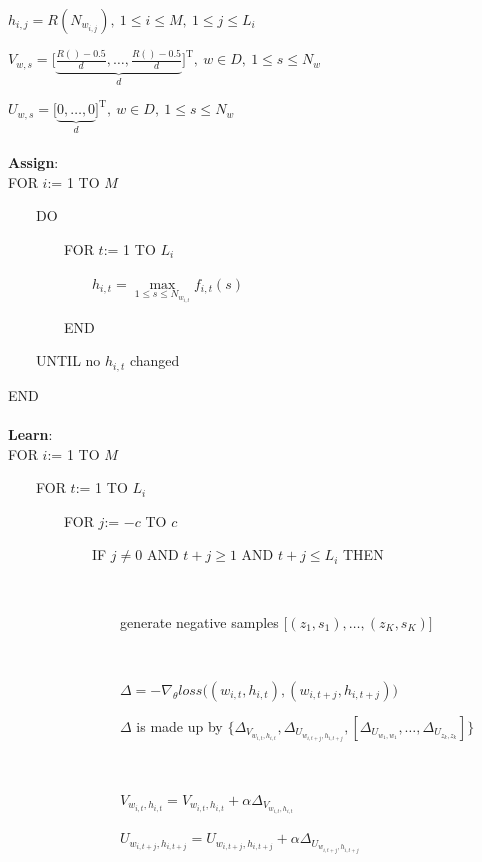 \documentclass[12pt,a4paper,twoside]{book}
\begin{document}
$h_{i,j} = R(N_{w_{i,j}}),  \ 1\leq i \leq M,  \ 1\leq j\leq L_i$

$V_{w,s} = \Big[\underbrace{\frac{R()-0.5}{d},\ldots,\frac{R()-0.5}{d}}_{d}\Big]^{\mathrm{T}}, \ w\in D, \  1\leq s\leq N_w$

$U_{w,s} = \Big[\underbrace{0,\ldots,0}_{d}\Big]^{\mathrm{T}},  \ w\in D, \  1\leq s\leq N_w$
\paragraph{} \textbf{Assign}:\\

FOR $i$:= 1 TO $M$

\ \ \ \ DO

\ \ \ \ \ \ \ \ FOR $t$:= 1 TO $L_i$

\ \ \ \ \ \ \ \ \ \ \ \ $h_{i,t} = \max\limits_{1\leq s\leq N_{w_{i,t}}} f_{i,t}(s)$

\ \ \ \ \ \ \ \ END

\ \ \ \ UNTIL no $h_{i,t}$ changed

END
\paragraph{} \textbf{Learn}:\\

FOR $i$:= 1 TO $M$

\ \ \ \ FOR $t$:= 1 TO $L_i$

\ \ \ \ \ \ \ \ FOR $j$:= $-c$ TO $c$

\ \ \ \ \ \ \ \ \ \ \ \ IF $j\neq 0$ AND $t+j\geq1$ AND $t+j\leq L_i$ THEN

\ \ \ \ \ \ \ \ \ \ \ \ \ \ \ \

\ \ \ \ \ \ \ \ \ \ \ \ \ \ \ \ generate negative samples $\big [(z_1,s_1),\ldots,(z_K,s_K)\big ]$

\ \ \ \ \ \ \ \ \ \ \ \ \ \ \ \

\ \ \ \ \ \ \ \ \ \ \ \ \ \ \ \ $\Delta = -\nabla_\theta loss\big ( (w_{i,t},h_{i,t}),(w_{i,t+j},h_{i,t+j})\big )$

\ \ \ \ \ \ \ \ \ \ \ \ \ \ \ \ $\Delta$ is made up by $ \{\Delta_{V_{w_{i,t},h_{i,t}}}, \Delta_{U_{w_{i,t+j},h_{i,t+j}}}, [\Delta_{U_{w_1,w_1}},\ldots,\Delta_{U_{z_k,z_k}}]\}$

\ \ \ \ \ \ \ \ \ \ \ \ \ \ \ \

\ \ \ \ \ \ \ \ \ \ \ \ \ \ \ \ $V_{w_{i,t},h_{i,t}} = V_{w_{i,t},h_{i,t}} + \alpha \Delta_{V_{w_{i,t},h_{i,t}}}$
 
\ \ \ \ \ \ \ \ \ \ \ \ \ \ \ \ $U_{w_{i,t+j},h_{i,t+j}} = U_{w_{i,t+j},h_{i,t+j}} + \alpha \Delta_{U_{w_{i,t+j},h_{i,t+j}}}$ 
\end{document}
